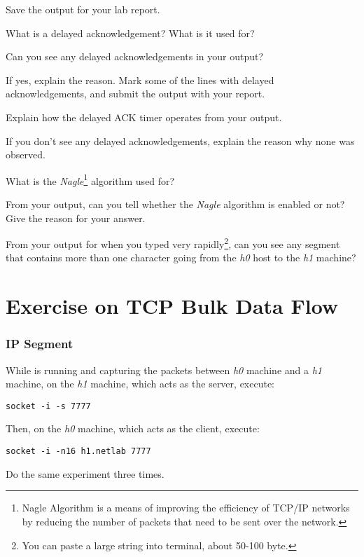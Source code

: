 \documentclass{../UTNetLab}
\begin{document}
{Save} the  output for your lab report.

\begin{report}
    \item What is a delayed acknowledgement?
    What is it used for?

    \item Can you see any delayed acknowledgements in your  output?

    If yes, explain the reason.
    Mark some of the lines with delayed acknowledgements, and submit the  output with your report.

    Explain how the delayed ACK timer operates from your  output.

    If you don’t see any delayed acknowledgements, explain the reason why none was observed.

    \item What is the \textit{Nagle}\footnote{Nagle Algorithm is a means of improving the efficiency of TCP/IP networks by reducing the number of packets that need to be sent over the network.} algorithm used for?

    From your  output, can you tell whether the \textit{Nagle} algorithm is enabled or not? Give the reason for your answer.

    From your  output for when you typed very rapidly\footnote{You can paste a large string into terminal, about 50-100 byte.}, can you see any segment that contains more than one character going from the \textit{h0} host to the \textit{h1} machine?
\end{report}

\part{Exercise on TCP Bulk Data Flow}
\section{IP Segment}
While  is running and capturing the packets between \textit{h0} machine and a \textit{h1} machine, on the \textit{h1} machine, which acts as the server, execute:
\begin{lstlisting}
socket -i -s 7777
    \end{lstlisting}
Then, on the \textit{h0} machine, which acts as the client, execute:
\begin{lstlisting}[emph={h1,netlab}]
socket -i -n16 h1.netlab 7777
    \end{lstlisting}
Do the same experiment three times.
\end{document}
